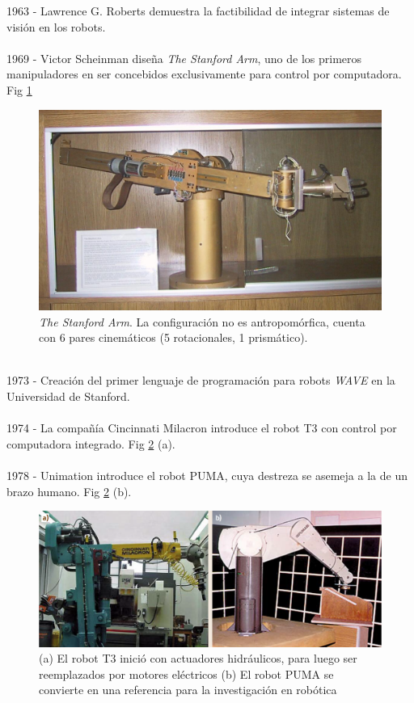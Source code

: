 1963 - Lawrence G. Roberts demuestra la factibilidad de integrar sistemas de visión en los robots.\\\\
1969 - Victor Scheinman diseña \textit{The Stanford Arm}, uno de los primeros manipuladores en ser concebidos exclusivamente para control por computadora. Fig \ref{stfarm}\\
\begin{figure}
	\centering
	\includegraphics[scale=0.25]{Capitulo1/figs/StanfordArm.jpg} 
	\caption{\textit{The Stanford Arm}. La configuración no es antropomórfica, cuenta con 6 pares cinemáticos (5 rotacionales, 1 prismático).}
	\label{stfarm}
\end{figure}\\
1973 - Creación del primer lenguaje de programación para robots \textit{WAVE} en la Universidad de Stanford.\\\\
1974 - La compañía Cincinnati Milacron introduce el robot T3 con control por computadora integrado. Fig \ref{puma} (a).\\\\
1978 - Unimation introduce el robot PUMA, cuya destreza se asemeja a la de un brazo humano. Fig \ref{puma} (b).\\
\begin{figure}
	\centering
	\includegraphics[scale=0.4]{Capitulo1/figs/puma.PNG} 
	\caption{(a) El robot T3 inició con actuadores hidráulicos, para luego ser reemplazados por motores eléctricos (b) El robot PUMA se convierte en una referencia para la investigación en robótica}
	\label{puma}
\end{figure}\\
